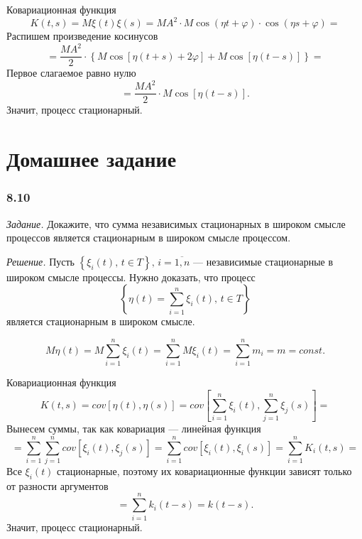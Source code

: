 Ковариационная функция
$$K \left( t, s \right) =
  M \xi \left( t \right) \xi \left( s \right) =
  M A^2 \cdot M \cos \left( \eta t + \varphi \right) \cdot \cos \left( \eta s + \varphi \right) =$$
Распишем произведение косинусов
$$= \frac{MA^2}{2} \cdot \left\{
  M \cos \left[ \eta \left( t + s \right) + 2 \varphi \right] +
  M \cos \left[ \eta \left( t - s \right) \right] \right\} =$$
Первое слагаемое равно нулю
$$= \frac{MA^2}{2} \cdot M \cos \left[ \eta \left( t - s \right) \right].$$
Значит, процесс стационарный.

\section*{Домашнее задание}

\subsubsection*{8.10}

\textit{Задание.}
Докажите, что сумма независимых стационарных в широком смысле процессов является стационарным в
широком смысле процессом.

\textit{Решение.}
Пусть $ \left\{ \xi_i \left( t \right), \, t \in T \right\}, \, i = \overline{1, n}$ ---
независимые стационарные в широком смысле процессы.
Нужно доказать, что процесс
$$ \left\{
  \eta \left( t \right) = \sum \limits_{i = 1}^n \xi_i \left( t \right), \, t \in T \right\} $$
является стационарным в широком смысле.

$$M \eta \left( t \right) =
  M \sum \limits_{i = 1}^n \xi_i \left( t \right) =
  \sum \limits_{i = 1}^n M \xi_i \left( t \right) =
  \sum \limits_{i = 1}^n m_i =
  m =
  const.$$

Ковариационная функция
$$K \left( t, s \right) =
  cov \left[ \eta \left( t \right), \eta \left( s \right) \right] =
  cov \left[
    \sum \limits_{i = 1}^n \xi_i \left( t \right), \sum \limits_{j = 1}^n \xi_j \left( s \right)
  \right] =$$
Вынесем суммы, так как ковариация --- линейная функция
$$= \sum \limits_{i = 1}^n
    \sum \limits_{j = 1}^n cov \left[ \xi_i \left( t \right), \xi_j \left( s \right) \right] =
  \sum \limits_{i = 1}^n cov \left[ \xi_i \left( t \right), \xi_i \left( s \right) \right] =
  \sum \limits_{i = 1}^n K_i \left( t, s \right) =$$
Все $ \xi_i \left( t \right) $ стационарные,
поэтому их ковариационные функции зависят только от разности аргументов
$$= \sum \limits_{i = 1}^n k_i \left( t - s \right) =
  k \left( t - s \right).$$
Значит, процесс стационарный.

